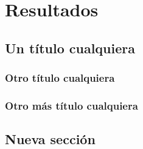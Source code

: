 
\chapter{Resultados}
\label{ch:resultados}

\lipsum[1]

\section{Un título cualquiera}

\lipsum[1]

\subsection{Otro título cualquiera}

\lipsum[2-4]

\subsection{Otro más título cualquiera}

\lipsum[5-6]

\section{Nueva sección}

\lipsum[1-3]

